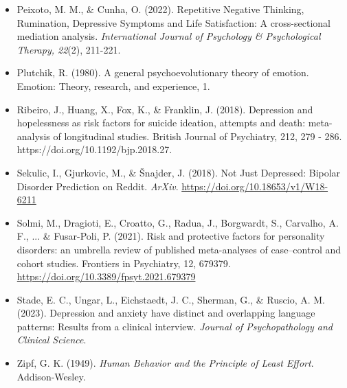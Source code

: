 \documentclass[11pt]{article}
\begin{document}
\begin{itemize}
    \item Peixoto, M. M., \& Cunha, O. (2022). Repetitive Negative Thinking, Rumination, Depressive Symptoms and Life Satisfaction: A cross-sectional mediation analysis. \textit{International Journal of Psychology \& Psychological Therapy, 22}(2), 211-221.
    \item Plutchik, R. (1980). A general psychoevolutionary theory of emotion. Emotion: Theory, research, and experience, 1.
    \item Ribeiro, J., Huang, X., Fox, K., \& Franklin, J. (2018). Depression and hopelessness as risk factors for suicide ideation, attempts and death: meta-analysis of longitudinal studies. British Journal of Psychiatry, 212, 279 - 286. https://doi.org/10.1192/bjp.2018.27.
    \item Sekulic, I., Gjurkovic, M., \& Šnajder, J. (2018). Not Just Depressed: Bipolar Disorder Prediction on Reddit. \textit{ArXiv}. \url{https://doi.org/10.18653/v1/W18-6211}
    \item Solmi, M., Dragioti, E., Croatto, G., Radua, J., Borgwardt, S., Carvalho, A. F., ... \& Fusar-Poli, P. (2021). Risk and protective factors for personality disorders: an umbrella review of published meta-analyses of case–control and cohort studies. Frontiers in Psychiatry, 12, 679379. \url {https://doi.org/10.3389/fpsyt.2021.679379}
    \item Stade, E. C., Ungar, L., Eichstaedt, J. C., Sherman, G., \& Ruscio, A. M. (2023). Depression and anxiety have distinct and overlapping language patterns: Results from a clinical interview. \textit{Journal of Psychopathology and Clinical Science}.
    \item Zipf, G. K. (1949). \textit{Human Behavior and the Principle of Least Effort}. Addison-Wesley.
\end{itemize}
\end{document}
